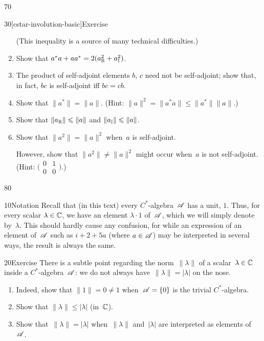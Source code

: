 \begin{parsec}{70}
\begin{point}{30}[cstar-involution-basic]{Exercise}
\begin{enumerate}
(This inequality is a source of many technical difficulties.)
\item
Show that $a^*a+aa^* = 2(a_{\mathbb{R}}^2+a_{\mathbb{I}}^2)$.
\item
The product of self-adjoint elements $b$, $c$ need not be self-adjoint;
show that, in fact, $bc$ is self-adjoint iff $bc=cb$.
\item
Show that $\|a^*\| = \|a\|$. (Hint:  $\|a\|^2=\|a^*a\|\leq \|a^*\|\|a\|$.)

\item
Show that $\|a_{\mathbb{R}}\|\leqslant \|a\|$ and $\|a_{\mathbb{I}}\|\leqslant \|a\|$.
\item
Show that $\|a^2\|=\|a\|^2$ when~$a$ is self-adjoint.

However,
show that $\|a^2\|\neq \|a\|^2$ might occur
when~$a$ is not self-adjoint.
(Hint: $\bigl(
\begin{smallmatrix}
	0&1\\
	0&0
\end{smallmatrix}
\bigr)$.)
\end{enumerate}%
\spacingfix{}
\end{point}%
\end{parsec}%
\begin{parsec}{80}%
\begin{point}{10}{Notation}%
Recall that (in this text) every $C^*$-algebra~$\mathscr{A}$ has a unit, $1$.
Thus, for every scalar $\lambda\in \mathbb{C}$,
we have an element $\lambda\cdot 1$ of~$\mathscr{A}$,
which we will simply denote by~$\lambda$.
This should hardly cause any confusion,
for while an expression of an element of~$\mathscr{A}$
such as $i+2+5a$ (where $a\in \mathscr{A}$) 
may be interpreted in several ways,
the result is always the same.
\end{point}
\begin{point}{20}{Exercise}%
There is a subtle point regarding
the norm~$\|\lambda\|$ of a
scalar~$\lambda\in \mathbb{C}$ inside a $C^*$-algebra~$\mathscr{A}$:
	we do not always have~$\|\lambda\|=\left|\lambda\right|$
	on the nose.
\begin{enumerate}
\item
Indeed, show 
that $\|1\|=0\neq 1$ when~$\mathscr{A}=\{0\}$ is the trivial $C^*$-algebra.
\item 
Show that $\|\lambda\|\leq \left| \lambda\right|$ (in~$\mathbb{C}$).
\item
Show that~$\|\lambda\|=\left|\lambda\right|$
when~$\|\lambda\|$ and~$\left|\lambda\right|$
are interpreted as elements of~$\mathscr{A}$.
\end{enumerate}%
\spacingfix{}%
\end{point}%
\end{parsec}%

